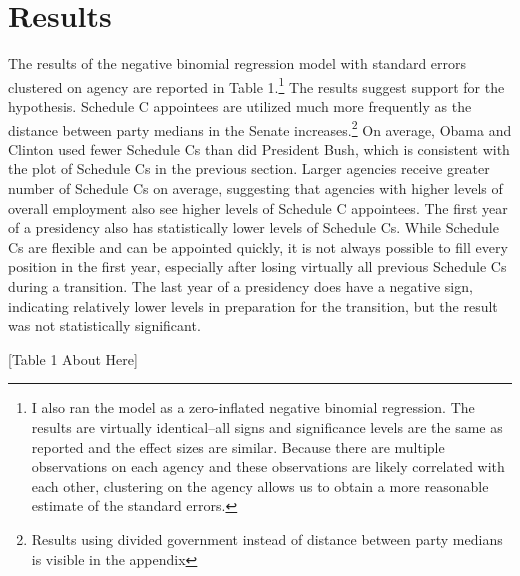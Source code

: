 \documentclass[12pt]{article}
\begin{document}
\section*{Results}
The results of the negative binomial regression model with standard errors clustered on agency are reported in Table 1.\footnote{I also ran the model as a zero-inflated negative binomial regression. The results are virtually identical--all signs and significance levels are the same as reported and the effect sizes are similar. Because there are multiple observations on each agency and these observations are likely correlated with each other, clustering on the agency allows us to obtain a more reasonable estimate of the standard errors.} The results suggest support for the hypothesis. Schedule C appointees are utilized much more frequently as the distance between party medians in the Senate increases.\footnote{Results using divided government instead of distance between party medians is visible in the appendix} On average, Obama and Clinton used fewer Schedule Cs than did President Bush, which is consistent with the plot of Schedule Cs in the previous section. Larger agencies receive greater number of Schedule Cs on average, suggesting that agencies with higher levels of overall employment also see higher levels of Schedule C appointees. The first year of a presidency also has statistically lower levels of Schedule Cs. While Schedule Cs are flexible and can be appointed quickly, it is not always possible to fill every position in the first year, especially after losing virtually all previous Schedule Cs during a transition. The last year of a presidency does have a negative sign, indicating relatively lower levels in preparation for the transition, but the result was not statistically significant. 

\begin{center}[Table 1 About Here]\end{center}
\end{document}
